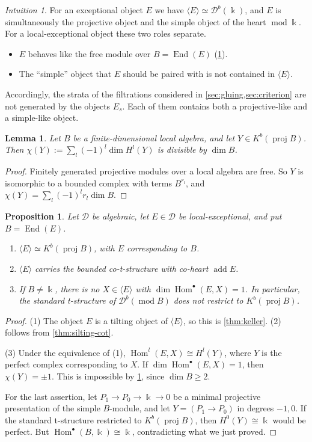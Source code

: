 \documentclass[11pt,reqno]{amsart}
\theoremstyle{plain}
\newtheorem{proposition}[theorem]{Proposition}
\newtheorem{lemma}[theorem]{Lemma}
\theoremstyle{definition}
\theoremstyle{remark}
\newtheorem*{intuition}{Intuition}
\newcommand{\kk}{\Bbbk}
\DeclareMathOperator{\Hom}{Hom}
\DeclareMathOperator{\End}{End}
\DeclareMathOperator{\add}{add}
\newcommand{\modd}{\operatorname{mod}}
\newcommand{\proj}{\operatorname{proj}}
\newcommand{\Db}{\mathcal{D}^b}
\newcommand{\Kb}{K^b}
\newcommand{\thick}[1]{\langle #1\rangle}
\newcommand{\cD}{\mathcal{D}}
\begin{document}
\begin{intuition}
For an exceptional object $E$ we have $\thick E\simeq\Db(\kk)$, and $E$ is simultaneously the projective object and the simple object of the heart $\modd\kk$. For a local-exceptional object these two roles separate.
\begin{itemize}
\item $E$ behaves like the free module over $B=\End(E)$ (\cref{prop:local-exc}).
\item The ``simple'' object that $E$ should be paired with is not contained in $\thick E$.
\end{itemize}
Accordingly, the strata of the filtrations considered in \cref{sec:gluing,sec:criterion} are not generated by the objects $E_s$. Each of them contains both a projective-like and a simple-like object.
\end{intuition}

\begin{lemma}\label{lem:euler}
Let $B$ be a finite-dimensional local algebra, and let $Y\in\Kb(\proj B)$. Then $\chi(Y):=\sum_l(-1)^l\dim H^l(Y)$ is divisible by $\dim B$.
\end{lemma}

\begin{proof}
Finitely generated projective modules over a local algebra are free. So $Y$ is isomorphic to a bounded complex with terms $B^{r_l}$, and $\chi(Y)=\sum_l(-1)^lr_l\dim B$.
\end{proof}

\begin{proposition}\label{prop:local-exc}
Let $\cD$ be algebraic, let $E\in\cD$ be local-exceptional, and put $B=\End(E)$.
\begin{enumerate}
\item $\thick E\simeq\Kb(\proj B)$, with $E$ corresponding to $B$.
\item $\thick E$ carries the bounded co-t-structure with co-heart $\add E$.
\item If $B\ne\kk$, there is no $X\in\thick E$ with $\dim\Hom^\bullet(E,X)=1$. In particular, the standard t-structure of $\Db(\modd B)$ does not restrict to $\Kb(\proj B)$.
\end{enumerate}
\end{proposition}

\begin{proof}
(1) The object $E$ is a tilting object of $\thick E$, so this is \cref{thm:keller}. (2) follows from \cref{thm:silting-cot}.

(3) Under the equivalence of (1), $\Hom^l(E,X)\cong H^l(Y)$, where $Y$ is the perfect complex corresponding to $X$. If $\dim\Hom^\bullet(E,X)=1$, then $\chi(Y)=\pm1$. This is impossible by \cref{lem:euler}, since $\dim B\ge2$.

For the last assertion, let $P_1\to P_0\to\kk\to0$ be a minimal projective presentation of the simple $B$-module, and let $Y=(P_1\to P_0)$ in degrees $-1,0$. If the standard t-structure restricted to $\Kb(\proj B)$, then $H^0(Y)\cong\kk$ would be perfect. But $\Hom^\bullet(B,\kk)\cong\kk$, contradicting what we just proved.
\end{proof}
\end{document}
